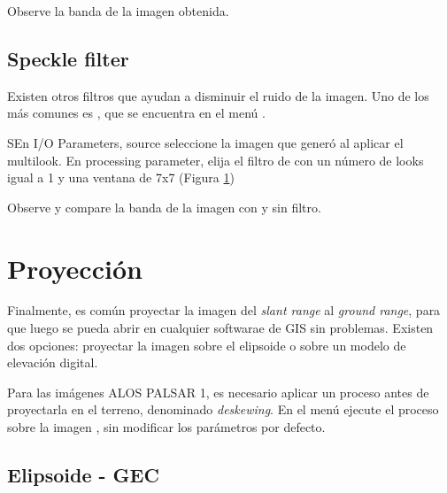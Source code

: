 \begin{que}
Observe la banda  de la imagen obtenida.
\end{que}


\subsection{Speckle filter}

Existen otros filtros que ayudan a disminuir el ruido de la imagen. Uno de los más comunes es  , que se encuentra en el menú .

\begin{figure}[h!]
    \centering
    \hfill
    \caption{}
    \label{fig:lee}
\end{figure}

SEn I/O Parameters, source seleccione la imagen  que generó al aplicar el multilook. En processing parameter, elija el filtro de  con un número de looks igual a 1 y una ventana de 7x7 (Figura \ref{fig:lee})



\begin{que}
    Observe y compare la banda  de la imagen con y sin filtro.
\end{que}

\section{Proyección}

Finalmente, es común proyectar la imagen del \emph{slant range} al \emph{ground range}, para que luego se pueda abrir en cualquier softwarae de GIS sin problemas. Existen dos opciones: proyectar la imagen sobre el elipsoide o sobre un modelo de elevación digital.

Para las imágenes ALOS PALSAR 1, es necesario aplicar un proceso antes de proyectarla en el terreno, denominado \emph{deskewing}. En el menú  ejecute el proceso sobre la imagen , sin modificar los parámetros por defecto.

\subsection{Elipsoide - GEC}

